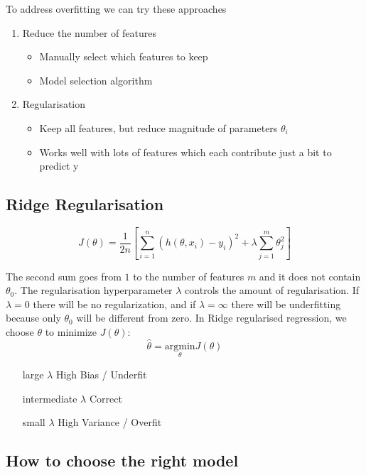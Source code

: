 \documentclass[a4paper, 11pt]{article}
\begin{document}
To address overfitting we can try these approaches
\begin{enumerate}
	\item Reduce the number of features
	\begin{itemize}
		\item Manually select which features to keep
		\item Model selection algorithm
	\end{itemize}
	\item Regularisation
	\begin{itemize}
		\item Keep all features, but reduce magnitude of parameters $\theta_i$
		\item Works well with lots of features which each contribute just a bit to predict y
	\end{itemize}
\end{enumerate}

\subsection{Ridge Regularisation}
\begin{equation}
	J(\theta) = \frac{1}{2n}\left[\sum_{i=1}^{n}(h(\theta,x_i)-y_i)^2 + \lambda \sum_{j=1}^{m}\theta_j^2\right]
\end{equation}

The second sum goes from $1$ to the number of features $m$ and it does not contain $\theta_0$. The regularisation hyperparameter $\lambda$ controls the amount of regularisation. If $\lambda = 0$ there will be no regularization, and if $\lambda = \infty$ there will be underfitting because only $\theta_0$ will be different from zero.
In Ridge regularised regression, we choose $\theta$ to minimize $J(\theta)$:
\begin{equation}
	\hat{\theta} = \underset{\theta}{\text{argmin}} J(\theta)
\end{equation}

\begin{itemize}[leftmargin=*, labelindent=3cm, labelsep=1cm]
	\item[large $\lambda$] High Bias / Underfit
	\item[intermediate $\lambda$] Correct
	\item[small $\lambda$] High Variance / Overfit
\end{itemize}

\subsection{How to choose the right model}
\end{document}
